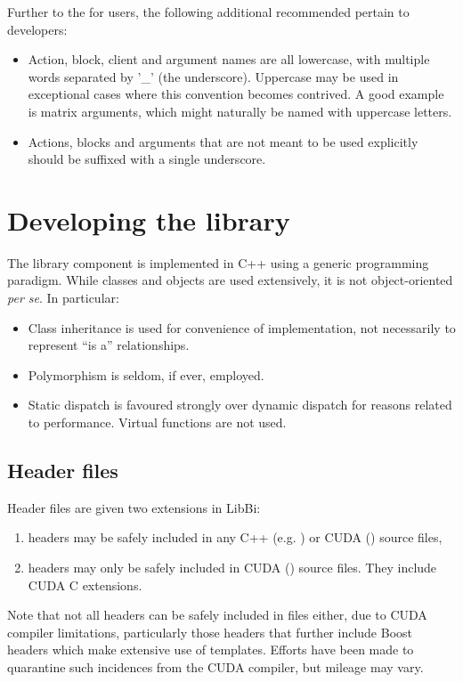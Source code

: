 Further to the  for users, the
following additional recommended pertain to developers:
\begin{itemize}
\item Action, block, client and argument names are all lowercase, with
  multiple words separated by '\_' (the underscore). Uppercase may be used in
  exceptional cases where this convention becomes contrived. A good example is
  matrix arguments, which might naturally be named with uppercase letters.
\item Actions, blocks and arguments that are not meant to be used explicitly
  should be suffixed with a single underscore.
\end{itemize}

\section{Developing the library}

The library component is implemented in C++ using a generic programming
paradigm. While classes and objects are used extensively, it is not
object-oriented \textsl{per se}. In particular:
\begin{itemize}
\item Class inheritance is used for convenience of implementation, not
  necessarily to represent ``is a'' relationships.
\item Polymorphism is seldom, if ever, employed.
\item Static dispatch is favoured strongly over dynamic dispatch for
  reasons related to performance. Virtual functions are not used.
\end{itemize}

\subsection{Header files}

Header files are given two extensions in LibBi:
\begin{enumerate}
\item {} headers may be safely included in any C++ (e.g.
) or CUDA () source files,
\item {} headers may only be safely included in CUDA ()
source files. They include CUDA C extensions.
\end{enumerate}

Note that not all  headers can be safely included in 
files either, due to CUDA compiler limitations, particularly those headers
that further include Boost headers which make extensive use of
templates. Efforts have been made to quarantine such incidences from the CUDA
compiler, but mileage may vary.

